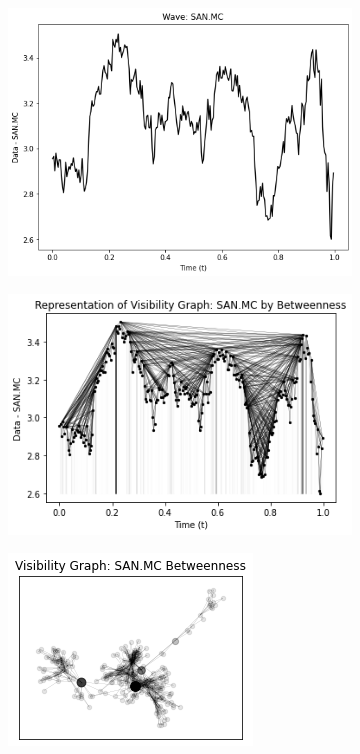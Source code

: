 \documentclass[12pt,a4paper]{article}
\begin{document}
\begin{figure}[H]
\centering
\begin{subfigure}{.3\textwidth}
  \centering
  \includegraphics[width=.9\linewidth]{serie}
  \label{fig:sub1}
\end{subfigure}%
\begin{subfigure}{.3\textwidth}
  \centering
  \includegraphics[width=.9\linewidth]{grafo de visibilidad (2)}
  \label{fig:sub1}
\end{subfigure}%
\begin{subfigure}{.3\textwidth}
  \centering
  \includegraphics[width=.9\linewidth]{grafo de visibilidad (1)}

\end{subfigure}
\end{figure}
\end{document}
